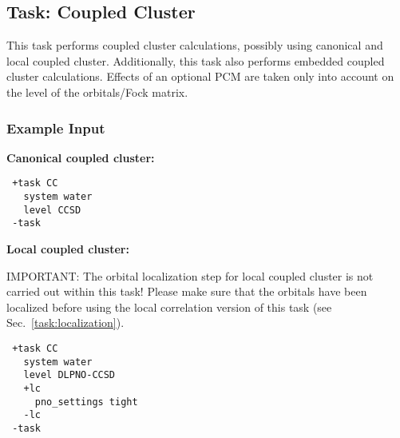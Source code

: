 \subsection{Task: Coupled Cluster\label{sec:coupledClusterTask}}
This task performs coupled cluster calculations, possibly using canonical and local coupled cluster.
Additionally, this task also performs embedded coupled cluster calculations. Effects of an optional
PCM are taken only into account on the level of the orbitals/Fock matrix.

\subsubsection{Example Input}
\textbf{Canonical coupled cluster:}
\begin{lstlisting}
 +task CC
   system water
   level CCSD
 -task
\end{lstlisting}
\textbf{Local coupled cluster:}

{\color{red}IMPORTANT: } The orbital localization step for local coupled cluster is not carried out
within this task! Please make sure that the orbitals have been localized before using the local
correlation version of this task (see Sec.~\ref{task:localization}).
\begin{lstlisting}
 +task CC
   system water
   level DLPNO-CCSD
   +lc
     pno_settings tight
   -lc
 -task
\end{lstlisting}
